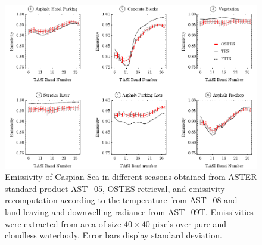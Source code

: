 \begin{figure}[!t]
\centering
\includegraphics[width=0.95\linewidth]{pics/Chapter_04/Brno-Emissivity-Comparison.pdf}
\vspace{1.5 em}
\caption{Emissivity of Caspian Sea in different seasons obtained from ASTER standard product AST\_05, OSTES retrieval, and emissivity recomputation according to the temperature from AST\_08 and land-leaving and downwelling radiance from AST\_09T. Emissivities were extracted from area of size $40 \times 40$ pixels over pure and cloudless waterbody. Error bars display standard deviation.}
\label{fig:BrnoEmissivityComparison}
\end{figure}